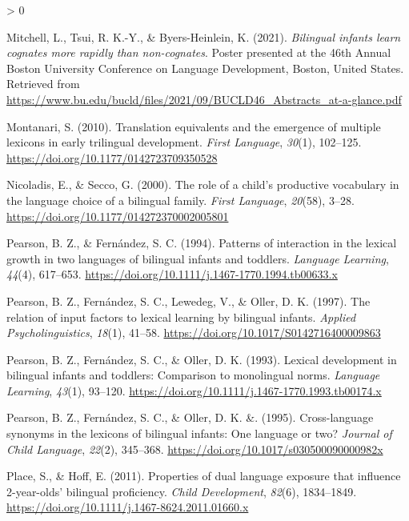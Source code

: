 \documentclass[
  english,
  ,man,floatsintext]{apa6}
\newlength{\cslhangindent}
\newenvironment{CSLReferences}[2] %
 {%
  \setlength{\parindent}{0pt}
  \ifodd #1 \everypar{\setlength{\hangindent}{\cslhangindent}}\ignorespaces\fi
  \ifnum #2 > 0
  \setlength{\parskip}{#2\baselineskip}
  \fi
 }%
 {}
\begin{document}
\begin{CSLReferences}{1}{0}
\leavevmode\hypertarget{ref-Mitchell_etal_2021}{}%
Mitchell, L., Tsui, R. K.-Y., \& Byers-Heinlein, K. (2021). \emph{Bilingual infants learn cognates more rapidly than non-cognates}. Poster presented at the 46th Annual Boston University Conference on Language Development, Boston, United States. Retrieved from \url{https://www.bu.edu/bucld/files/2021/09/BUCLD46_Abstracts_at-a-glance.pdf}

\leavevmode\hypertarget{ref-Montanari_2010}{}%
Montanari, S. (2010). Translation equivalents and the emergence of multiple lexicons in early trilingual development. \emph{First Language}, \emph{30}(1), 102--125. \url{https://doi.org/10.1177/0142723709350528}

\leavevmode\hypertarget{ref-Nicoladis_Secco_2000}{}%
Nicoladis, E., \& Secco, G. (2000). The role of a child's productive vocabulary in the language choice of a bilingual family. \emph{First Language}, \emph{20}(58), 3--28. \url{https://doi.org/10.1177/014272370002005801}

\leavevmode\hypertarget{ref-Pearson_Fernandez_1994}{}%
Pearson, B. Z., \& Fernández, S. C. (1994). Patterns of interaction in the lexical growth in two languages of bilingual infants and toddlers. \emph{Language Learning}, \emph{44}(4), 617--653. \url{https://doi.org/10.1111/j.1467-1770.1994.tb00633.x}

\leavevmode\hypertarget{ref-Pearson_etal_1997}{}%
Pearson, B. Z., Fernández, S. C., Lewedeg, V., \& Oller, D. K. (1997). The relation of input factors to lexical learning by bilingual infants. \emph{Applied Psycholinguistics}, \emph{18}(1), 41--58. \url{https://doi.org/10.1017/S0142716400009863}

\leavevmode\hypertarget{ref-Pearson_etal_1993}{}%
Pearson, B. Z., Fernández, S. C., \& Oller, D. K. (1993). Lexical development in bilingual infants and toddlers: Comparison to monolingual norms. \emph{Language Learning}, \emph{43}(1), 93--120. \url{https://doi.org/10.1111/j.1467-1770.1993.tb00174.x}

\leavevmode\hypertarget{ref-Pearson_etal_1995}{}%
Pearson, B. Z., Fernández, S. C., \& Oller, D. K. \&. (1995). Cross-language synonyms in the lexicons of bilingual infants: One language or two? \emph{Journal of Child Language}, \emph{22}(2), 345--368. \url{https://doi.org/10.1017/s030500090000982x}

\leavevmode\hypertarget{ref-Place_Hoff_2011}{}%
Place, S., \& Hoff, E. (2011). Properties of dual language exposure that influence 2-year-olds' bilingual proficiency. \emph{Child Development}, \emph{82}(6), 1834--1849. \url{https://doi.org/10.1111/j.1467-8624.2011.01660.x}


\end{CSLReferences}
\end{document}
